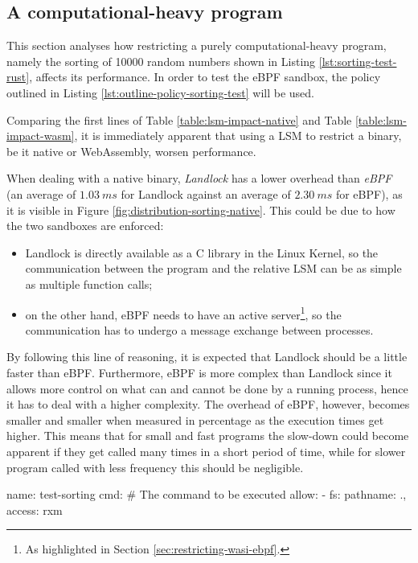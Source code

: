 \subsection{A computational-heavy program}

This section analyses how restricting a purely computational-heavy program, namely the sorting of 
10000 random numbers shown in Listing \ref{lst:sorting-test-rust}, affects its performance.
In order to test the eBPF sandbox, the policy outlined in Listing \ref{lst:outline-policy-sorting-test} will be used.

Comparing the first lines of Table \ref{table:lsm-impact-native} and Table \ref{table:lsm-impact-wasm},
it is immediately apparent that using a LSM to restrict a binary, be it native or WebAssembly, worsen performance.

When dealing with a native binary, \textit{Landlock} has a lower overhead than \textit{eBPF} (an average
of $1.03\ ms$ for Landlock against an average of $2.30\ ms$ for eBPF), as it is visible in Figure \ref{fig:distribution-sorting-native}.
This could be due to how the two sandboxes are enforced:
\begin{itemize}
  \item Landlock is directly available as a C library in the Linux Kernel, so the communication between
        the program and the relative LSM can be as simple as multiple function calls;
  \item on the other hand, eBPF needs to have an active server\footnote{As highlighted in Section \ref{sec:restricting-wasi-ebpf}.},
        so the communication has to undergo a message exchange between processes.
\end{itemize}
By following this line of reasoning, it is expected that Landlock should be a little faster than eBPF.
Furthermore, eBPF is more complex than Landlock since it allows more control on what
can and cannot be done by a running process, hence it has to deal with a higher complexity.
The overhead of eBPF, however, becomes smaller and smaller when measured in percentage as the execution times get higher.
This means that for small and fast programs the slow-down could become apparent if they get called many times
in a short period of time, while for slower program called with less frequency this should be negligible.

\vspace*{0.5cm}
\begin{code}[language=yaml, caption=The outline of the policy used for testing the sorting program., label=lst:outline-policy-sorting-test]
name: test-sorting
cmd: # The command to be executed
allow:
  - fs: {pathname: ., access: rxm}
\end{code}

